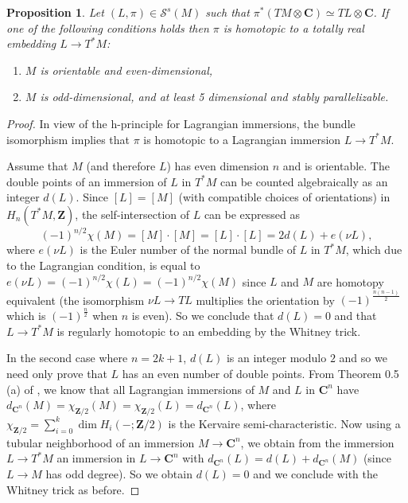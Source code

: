 \documentclass[reqno]{amsart}
\theoremstyle{theorem}
\newtheorem{proposition}[corollary]{Proposition}
\theoremstyle{remark}
\theoremstyle{definition}
\newcommand{\C}{\mathbf{C}}
\newcommand{\Z}{\mathbf{Z}}
\renewcommand{\SS}{\mathcal{S}}
\begin{document}
\begin{proposition}\label{prop:softmore}
Let $(L,\pi) \in \SS^s(M)$ such that $\pi^* (TM \otimes \C)\simeq TL \otimes \C$.
If one of the following conditions holds then $\pi$ is homotopic to a totally real embedding $L\to T^*M$:
\begin{enumerate}
\item $M$ is orientable and even-dimensional,
\item $M$ is odd-dimensional, and at least 5 dimensional and stably parallelizable.
\end{enumerate}
\end{proposition}
\begin{proof}
In view of the h-principle for Lagrangian immersions, the bundle isomorphism implies that $\pi$ is homotopic
to a Lagrangian immersion $L\to T^*M$.


Assume that $M$ (and therefore $L$) has even dimension $n$ and is orientable. The double points of an immersion of $L$ in $T^* M$
can be counted algebraically as an integer $d(L)$. Since $[L]=[M]$ (with compatible choices of orientations)
in $H_n(T^* M,\Z)$, the self-intersection of $L$ can be expressed as
\[(-1)^{n/2}\chi(M)=[M]\cdot [M]=[L]\cdot [L]=2 d(L) + e(\nu L),\]
where $e(\nu L)$ is the Euler number of the normal bundle of $L$ in $T^*M$, which due to the Lagrangian condition,
is equal to $e(\nu L)=(-1)^{n/2}\chi(L)=(-1)^{n/2}\chi(M)$ since $L$ and $M$ are homotopy equivalent (the isomorphism $\nu L \to TL$ multiplies the orientation by $(-1)^{\frac{n(n-1)}{2}}$ which is $(-1)^{\frac{n}{2}}$ when $n$ is even).
So we conclude that $d(L)=0$ and that $L\to T^*M$ is regularly homotopic to an embedding by the Whitney trick.






In the second case where $n=2k+1$, $d(L)$ is an integer modulo $2$ and so we need only prove that $L$ has an even number of double points.
From Theorem 0.5 (a) of \cite{A88}, we know that all Lagrangian immersions of $M$ and $L$ in $\C^n$ have $d_{\C^n}(M)=\chi_{\Z/2}(M)=\chi_{\Z/2}(L)=d_{\C^n}(L)$,
where $\chi_{\Z/2} =\sum_{i=0}^k \dim H_i(-;\Z/2)$ is the Kervaire semi-characteristic. Now using a tubular neighborhood of an immersion $M\to\C^n$, we obtain
from the immersion $L\to T^* M$ an immersion in $L\to \C^n$ with $d_{\C^n}(L)=d(L)+d_{\C^n}(M)$ (since $L\to M$ has odd degree).
So we obtain $d(L)=0$ and we conclude with the Whitney trick as before.
\end{proof}
\end{document}
